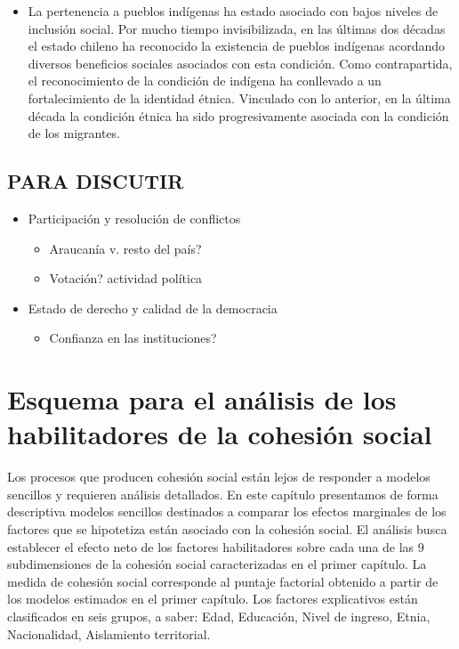\documentclass[
  12pt,
]{book}
\providecommand{\tightlist}{%
  \setlength{\itemsep}{0pt}\setlength{\parskip}{0pt}}
\begin{document}
\begin{itemize}
\item
  La pertenencia a pueblos indígenas ha estado asociado con bajos niveles de inclusión social. Por mucho tiempo invisibilizada, en las últimas dos décadas el estado chileno ha reconocido la existencia de pueblos indígenas acordando diversos beneficios sociales asociados con esta condición. Como contrapartida, el reconocimiento de la condición de indígena ha conllevado a un fortalecimiento de la identidad étnica. Vinculado con lo anterior, en la última década la condición étnica ha sido progresivamente asociada con la condición de los migrantes.
\end{itemize}

\hypertarget{para-discutir}{%
\subsection{PARA DISCUTIR}\label{para-discutir}}

\begin{itemize}
\tightlist
\item
  Participación y resolución de conflictos

  \begin{itemize}
  \tightlist
  \item
    Araucanía v. resto del país?
  \item
    Votación? actividad política
  \end{itemize}
\item
  Estado de derecho y calidad de la democracia

  \begin{itemize}
  \tightlist
  \item
    Confianza en las instituciones?
  \end{itemize}
\end{itemize}

\hypertarget{esquema-para-el-anuxe1lisis-de-los-habilitadores-de-la-cohesiuxf3n-social}{%
\section{Esquema para el análisis de los habilitadores de la cohesión social}\label{esquema-para-el-anuxe1lisis-de-los-habilitadores-de-la-cohesiuxf3n-social}}

Los procesos que producen cohesión social están lejos de responder a modelos sencillos y requieren análisis detallados. En este capítulo presentamos de forma descriptiva modelos sencillos destinados a comparar los efectos marginales de los factores que se hipotetiza están asociado con la cohesión social. El análisis busca establecer el efecto neto de los factores habilitadores sobre cada una de las 9 subdimensiones de la cohesión social caracterizadas en el primer capítulo. La medida de cohesión social corresponde al puntaje factorial obtenido a partir de los modelos estimados en el primer capítulo. Los factores explicativos están clasificados en seis grupos, a saber: Edad, Educación, Nivel de ingreso, Etnia, Nacionalidad, Aislamiento territorial.
\end{document}
